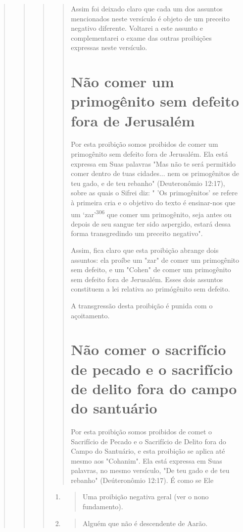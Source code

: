\begin{quote}
\begin{quote}
\begin{quote}
\begin{quote}
Assim foi deixado claro que cada um dos assuntos mencionados neste
versículo é objeto de um preceito negativo diferente. Voltarei a este
assunto e complementarei o exame das outras proibições expressas neste
versículo.

\section{Não comer um primogênito sem defeito fora de Jerusalém}

Por esta proibição somos proibidos de comer um primogênito sem defeito
fora de Jerusalém. Ela está expressa em Suas palavras "Mas não te será
permitido comer dentro de tuas cidades... nem os primogênitos de teu
gado, e de teu rebanho" (Deuteronômio 12:17), sobre as quais o Sifrei
diz: " 'Os pri­mogênitos' se refere à primeira cria e o objetivo do
texto é ensinar-nos que um `zar'\textsuperscript{306} que comer um
primogênito, seja antes ou depois de seu sangue ter sido aspergido,
estará dessa forma transgredindo um preceito negativo".

Assim, fica claro que esta proibição abrange dois assuntos: ela proí­be
um "zar" de comer um primogênito sem defeito, e um "Cohen" de comer um
primogênito sem defeito fora de Jerusalém. Esses dois assuntos
constituem a lei relativa ao primógênito sem defeito.

A transgressão desta proibição é punida com o açoitamento.

\section{Não comer o sacrifício de pecado e o sacrifício de delito fora 
do campo do santuário}

Por esta proibição somos proibidos de comet o Sacrifício de Pecado e o
Sacrifício de Delito fora do Campo do Santuário, e esta proibição se
aplica até mesmo aos "Cohanim". Ela está expressa em Suas palavras, no
mesmo ver­sículo, "De teu gado e de teu rebanho" (Deúteronômio 12:17). É
como se Ele
\end{quote}

\begin{enumerate}
\def\labelenumi{\arabic{enumi}.}
\setcounter{enumi}{304}
\item
 \begin{quote}
 Uma proibição negativa geral (ver o nono fundamento).
 \end{quote}
\item
 \begin{quote}
 Alguém que não é descendente de Aarão.
 \end{quote}
\end{enumerate}



\end{quote}
\end{quote}
\end{quote}
